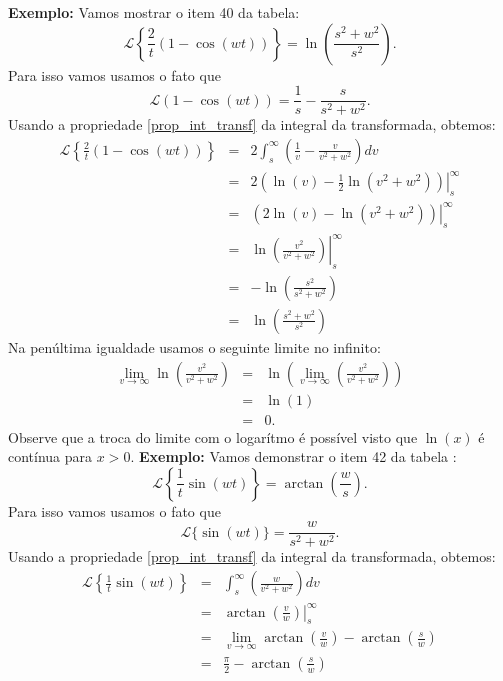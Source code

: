 \documentclass[a4paper,10pt]{book}
\begin{document}
{\bf Exemplo:} 
Vamos mostrar o item 40 da tabela:
 \begin{equation}
 \mathcal{L}\left\{\frac{2}{t}\left(1-\cos(wt)\right)\right\}=\ln\left(\frac{s^2+w^2}{s^2}\right).
 \end{equation}
 Para isso vamos usamos o fato que
 \begin{equation*}
 \mathcal{L}\left(1-\cos(wt)\right)=\frac{1}{s}-\frac{s}{s^2+w^2}.
 \end{equation*}
 Usando a propriedade \ref{prop_int_transf} da integral da transformada, obtemos:
 \begin{eqnarray*}
 \mathcal{L}\left\{\frac{2}{t}\left(1-\cos(wt)\right)\right\}&=&2\int_s^\infty \left(\frac{1}{v}-\frac{v}{v^2+w^2}\right)dv\\
 &=& \left.2\left(\ln(v)-\frac{1}{2}\ln(v^2+w^2)\right)\right|_s^\infty\\
 &=& \left.\left(2\ln(v)-\ln(v^2+w^2)\right)\right|_s^\infty\\
 &=&\left.\ln\left(\frac{v^2}{v^2+w^2}\right)\right|_s^\infty\\
 &=&-\ln\left(\frac{s^2}{s^2+w^2}\right)\\
 &=&\ln\left(\frac{s^2+w^2}{s^2}\right)
 \end{eqnarray*}
  Na penúltima igualdade usamos o seguinte limite no infinito:
  \begin{eqnarray*}
  \lim_{v\to\infty} \ln\left(\frac{v^2}{v^2+w^2}\right)&=& \ln\left(\lim_{v\to\infty}\left(\frac{v^2}{v^2+w^2}\right)\right)\\
  &=& \ln\left(1\right)\\
  &=&0.
  \end{eqnarray*}
  Observe que a troca do limite com o logarítmo é possível visto que $\ln(x)$ é contínua para $x>0$.
%  
  {\bf Exemplo:} Vamos demonstrar o item 42 da tabela :
  \begin{equation}
  \mathcal{L}\left\{\frac{1}{t}\sin(wt)\right\}=\arctan\left(\frac{w}{s}\right).
  \end{equation}
  Para isso vamos usamos o fato que
 \begin{equation*}
 \mathcal{L}\{\sin(wt)\}=\frac{w}{s^2+w^2}.
 \end{equation*}
 Usando a propriedade \ref{prop_int_transf} da integral da transformada, obtemos:
 \begin{eqnarray*}
 \mathcal{L}\left\{\frac{1}{t}\sin(wt)\right\}&=&\int_s^\infty \left(\frac{w}{v^2+w^2}\right)dv\\
 &=& \left.\arctan\left(\frac{v}{w}\right)\right|_s^\infty\\
 &=&\lim_{v\to\infty}\arctan\left(\frac{v}{w}\right)-\arctan\left(\frac{s}{w}\right)\\
 &=&\frac{\pi}{2}-\arctan\left(\frac{s}{w}\right)\\
 \end{eqnarray*}
\end{document}
